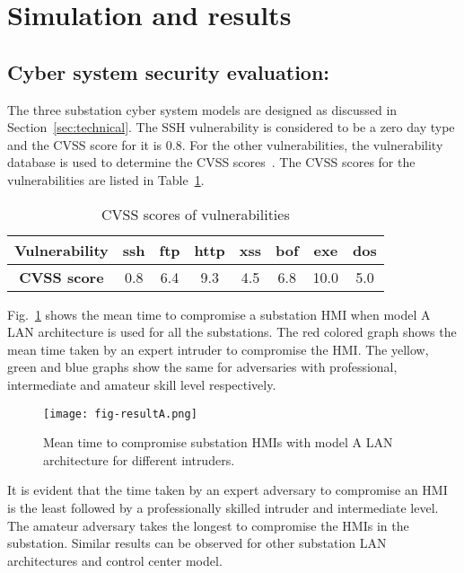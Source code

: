 \section{Simulation and results}\label{sec:simulation}
\subsection{Cyber system security evaluation:} 
The three substation cyber system models are designed as discussed in Section~\ref{sec:technical}. The SSH vulnerability is considered to be a zero day type and the CVSS score for it is $0.8$. For the other vulnerabilities, the vulnerability database is used to determine the CVSS scores~\cite{nist1,nist2,ftp,http,ssh}. The CVSS scores for the vulnerabilities are listed in Table~\ref{tbl:CVSS}.
\begin{table}[ht]
	\centering
	\small
	\caption{CVSS scores of vulnerabilities}
	\label{tbl:CVSS}
	\begin{tabular}{|c|c|c|c|c|c|c|c|}
		\hline
		\textbf{Vulnerability} & ssh & ftp & http & xss & bof & exe & dos \\ \hline
		\textbf{CVSS score}    & 0.8 & 6.4 & 9.3  & 4.5 & 6.8 & 10.0& 5.0 \\ \hline
	\end{tabular}
\end{table}

Fig.~\ref{fig:result-A} shows the mean time to compromise a substation HMI when model A LAN architecture is used for all the substations. The red colored graph shows the mean time taken by an expert intruder to compromise the HMI. The yellow, green and blue graphs show the same for adversaries with professional, intermediate and amateur skill level respectively.  
\begin{figure}[htbp]
	\centering
	\texttt{[image: fig-resultA.png]}
	\caption{Mean time to compromise substation HMIs with model A LAN architecture for different intruders.}
	\label{fig:result-A}
\end{figure}

It is evident that the time taken by an expert adversary to compromise an HMI is the least followed by a professionally skilled intruder and intermediate level. The amateur adversary takes the longest to compromise the HMIs in the substation. Similar results can be observed for other substation LAN architectures and control center model. 

